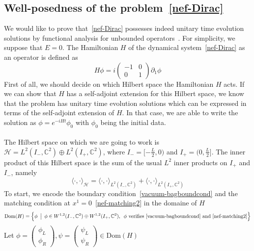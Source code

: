 \subsection{Well-posedness of the problem~\cref{nef-Dirac}}\label{vacuum-subsect-sa}
We would like to prove that~\cref{nef-Dirac} possesses indeed unitary time evolution solutions by functional analysis for unbounded operators~\cite{Reed1975}.
For simplicity, 
we suppose that $E = 0$.
The Hamiltonian $H$ of the dynamical system~\cref{nef-Dirac} as an operator is defined as
\begin{equation}
H \phi = i \begin{pmatrix}
-1  &  0 \\
0  &  1  \end{pmatrix} \partial_1 \phi 
\end{equation}
First of all, we should decide on which Hilbert space the Hamiltonian $H$ acts.
If we can show that $H$ has a self-adjoint extension for this Hilbert space, 
we know that the problem has unitary time evolution solutions which can be expressed in terms of the self-adjoint extension of $H$.
In that case, we are able to write the solution as $\phi =  e^{-iHt}\phi_0$ with $\phi_0$ being the initial data.
\\\\
%
The Hilbert space on which we are going to work is $\mathcal{H} = L^{2}(I_-, \mathbb{C}^2) \oplus L^{2}(I_+, \mathbb{C}^2)$,  where $I_- = [-\frac{L}{2}, 0)$ and $I_+ = (0, \frac{L}{2}]$.
The inner product of this Hilbert space is the sum of the usual $L^2$ inner products on $I_+$ and $I_-$, namely
\begin{equation*}
\langle \cdot, \cdot\rangle_{\mathcal{H} } = \langle \cdot, \cdot\rangle_{L^{2}(I_-, \mathbb{C}^2)} +\langle \cdot, \cdot\rangle_{L^{2}(I_+, \mathbb{C}^2)}
\end{equation*}
To start, we encode the boundary condition~\cref{vacuum-bagboundcond} and the matching condition at $x^1 = 0$~\cref{nef-matching2} in the domaine of $H$ 
\begin{equation*}
\mathrm{Dom}(H) = \Big \{\phi \enskip \big\vert \enskip \phi \in W^{1,2}(I_-, \mathbb{C}^2) \oplus W^{1,2}(I_+, \mathbb{C}^2), \enskip \phi \textrm{ verifies~\cref{vacuum-bagboundcond} and~\cref{nef-matching2}} \Big \}
\end{equation*} 
Let $ \phi = \begin{pmatrix} \phi_L \\ \phi_R \end{pmatrix}, \psi = \begin{pmatrix} \psi_L \\ \psi_R \end{pmatrix} \in \mathrm{Dom}(H)$
